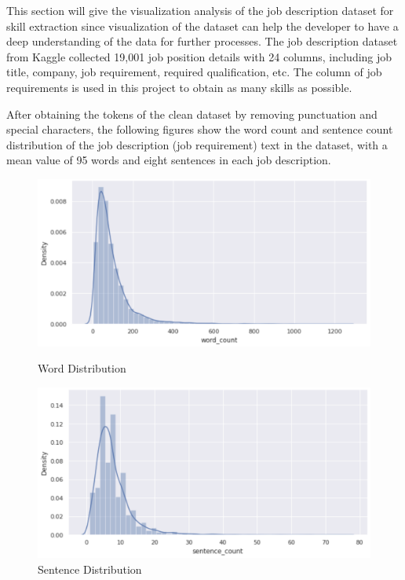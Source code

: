 This section will give the visualization analysis of the job description dataset for skill extraction since visualization of the dataset can help the developer to have a deep understanding of the data for further processes. The job description dataset from Kaggle collected 19,001 job position details with 24 columns, including job title, company, job requirement, required qualification, etc. The column of job requirements is used in this project to obtain as many skills as possible.

After obtaining the tokens of the clean dataset by removing punctuation and special characters, the following figures show the word count and sentence count distribution of the job description (job requirement) text in the dataset, with a mean value of 95 words and eight sentences in each job description.

\begin{figure}[H]
    \begin{minipage}[t]{0.5\linewidth}
        \centering
        \includegraphics[scale=0.35]{images/wordcount.png}
        \caption{Word Distribution}
        \label{fig:21}
    \end{minipage}%
    \begin{minipage}[t]{0.5\linewidth}
        \centering
        \includegraphics[scale=0.35]{images/sentencecount.png}
        \caption{Sentence Distribution}
        \label{fig:22}
    \end{minipage}
\end{figure}


